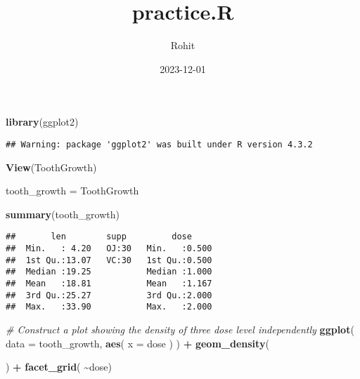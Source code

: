 \documentclass[
]{article}
\title{practice.R}
\author{Rohit}
\date{2023-12-01}
\newenvironment{Shaded}{\begin{snugshade}}{\end{snugshade}}
\newcommand{\AttributeTok}[1]{\textcolor[rgb]{0.13,0.29,0.53}{#1}}
\newcommand{\CommentTok}[1]{\textcolor[rgb]{0.56,0.35,0.01}{\textit{#1}}}
\newcommand{\FunctionTok}[1]{\textcolor[rgb]{0.13,0.29,0.53}{\textbf{#1}}}
\newcommand{\NormalTok}[1]{#1}
\newcommand{\OtherTok}[1]{\textcolor[rgb]{0.56,0.35,0.01}{#1}}
\newcommand{\SpecialCharTok}[1]{\textcolor[rgb]{0.81,0.36,0.00}{\textbf{#1}}}
\newcommand{\StringTok}[1]{\textcolor[rgb]{0.31,0.60,0.02}{#1}}
\begin{document}
\maketitle

\begin{Shaded}
\begin{Highlighting}[]
\FunctionTok{library}\NormalTok{(ggplot2)}
\end{Highlighting}
\end{Shaded}

\begin{verbatim}
## Warning: package 'ggplot2' was built under R version 4.3.2
\end{verbatim}

\begin{Shaded}
\begin{Highlighting}[]
\FunctionTok{View}\NormalTok{(ToothGrowth)}

\NormalTok{tooth\_growth }\OtherTok{=}\NormalTok{ ToothGrowth}

\FunctionTok{summary}\NormalTok{(tooth\_growth)}
\end{Highlighting}
\end{Shaded}

\begin{verbatim}
##       len        supp         dose      
##  Min.   : 4.20   OJ:30   Min.   :0.500  
##  1st Qu.:13.07   VC:30   1st Qu.:0.500  
##  Median :19.25           Median :1.000  
##  Mean   :18.81           Mean   :1.167  
##  3rd Qu.:25.27           3rd Qu.:2.000  
##  Max.   :33.90           Max.   :2.000
\end{verbatim}

\begin{Shaded}
\begin{Highlighting}[]
\CommentTok{\# Construct a plot showing the density of three dose level independently}
\FunctionTok{ggplot}\NormalTok{(}
  \AttributeTok{data =}\NormalTok{ tooth\_growth,}
  \FunctionTok{aes}\NormalTok{(    }\AttributeTok{x =} \StringTok{\textasciigrave{}}\AttributeTok{dose}\StringTok{\textasciigrave{}}\NormalTok{  )}
\NormalTok{) }\SpecialCharTok{+} \FunctionTok{geom\_density}\NormalTok{(}
  
\NormalTok{) }\SpecialCharTok{+} \FunctionTok{facet\_grid}\NormalTok{(  }\SpecialCharTok{\textasciitilde{}}\StringTok{\textasciigrave{}}\AttributeTok{dose}\StringTok{\textasciigrave{}}\NormalTok{)}
\end{Highlighting}
\end{Shaded}
\end{document}
